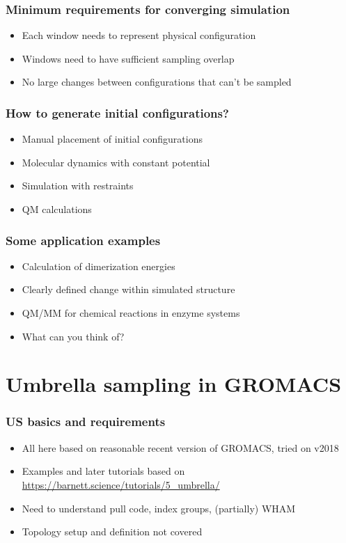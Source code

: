 \documentclass{beamer}
\numberwithin{table}{section}
\numberwithin{figure}{section}
\numberwithin{equation}{section}
\begin{document}
\begin{frame}
\frametitle{Minimum requirements for converging simulation}
    \begin{itemize}
        \item{Each window needs to represent physical configuration}
        \item{Windows need to have sufficient sampling overlap}
        \item{No large changes between configurations that can't be sampled}
    \end{itemize}
\end{frame}

\begin{frame}
\frametitle{How to generate initial configurations?}
    \begin{itemize}
        \item{Manual placement of initial configurations}
        \item{Molecular dynamics with constant potential}
        \item{Simulation with restraints}
        \item{QM calculations}
    \end{itemize}
\end{frame}

\begin{frame}
\frametitle{Some application examples}
    \begin{itemize}
        \item{Calculation of dimerization energies}
        \item{Clearly defined change within simulated structure}
        \item{QM/MM for chemical reactions in enzyme systems}
        \item{What can you think of?}
    \end{itemize}
\end{frame}

\section{Umbrella sampling in GROMACS}

\begin{frame}
\frametitle{US basics and requirements}
    \begin{itemize}
        \item{All here based on reasonable recent version of GROMACS, tried on v2018}
        \item{Examples and later tutorials based on \url{https://barnett.science/tutorials/5_umbrella/}}
        \item{Need to understand pull code, index groups, (partially) WHAM}
        \item{Topology setup and definition not covered}
    \end{itemize}
\end{frame}
\end{document}
